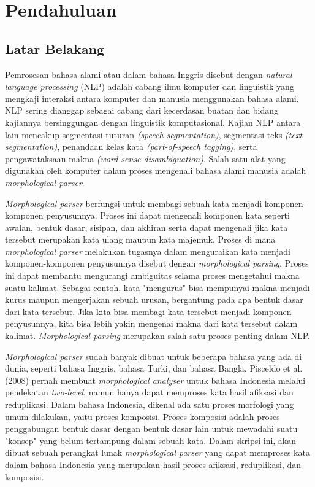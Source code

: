 \chapter{Pendahuluan}
\label{chap:pendahuluan}

\section{Latar Belakang}
\label{sec:latarBelakang}

Pemrosesan bahasa alami atau dalam bahasa Inggris disebut dengan {\it natural language processing} (NLP) adalah cabang ilmu komputer dan linguistik yang mengkaji interaksi antara komputer dan manusia menggunakan bahasa alami. NLP sering dianggap sebagai cabang dari kecerdasan buatan dan bidang kajiannya bersinggungan dengan linguistik komputasional. Kajian NLP antara lain mencakup segmentasi tuturan {\it (speech segmentation)}, segmentasi teks {\it (text segmentation)}, penandaan kelas kata {\it (part-of-speech tagging)}, serta pengawataksaan makna {\it (word sense disambiguation)}. Salah satu alat yang digunakan oleh komputer dalam proses mengenali bahasa alami manusia adalah {\it morphological parser}.

{\it Morphological parser} berfungsi untuk membagi sebuah kata menjadi komponen-komponen penyusunnya. Proses ini dapat mengenali komponen kata seperti awalan, bentuk dasar, sisipan, dan akhiran serta dapat mengenali jika kata tersebut merupakan kata ulang maupun kata majemuk. Proses di mana {\it morphological parser} melakukan tugasnya dalam menguraikan kata menjadi komponen-komponen penyusunnya disebut dengan {\it morphological parsing}. Proses ini dapat membantu mengurangi ambiguitas selama proses mengetahui makna suatu kalimat. Sebagai contoh, kata "mengurus" bisa mempunyai makna menjadi kurus maupun mengerjakan sebuah urusan, bergantung pada apa bentuk dasar dari kata tersebut. Jika kita bisa membagi kata tersebut menjadi komponen penyusunnya, kita bisa lebih yakin mengenai makna dari kata tersebut dalam kalimat. {\it Morphological parsing} merupakan salah satu proses penting dalam NLP.

{\it Morphological parser} sudah banyak dibuat untuk beberapa bahasa yang ada di dunia, seperti bahasa Inggris, bahasa Turki\cite{hasim:08:turkish}, dan bahasa Bangla\cite{sajib:10:bangla}. Pisceldo et al. (2008) pernah membuat \textit{morphological analyser} untuk bahasa Indonesia melalui pendekatan \textit{two-level}, namun hanya dapat memproses kata hasil afiksasi dan reduplikasi. Dalam bahasa Indonesia, dikenal ada satu proses morfologi yang umum dilakukan, yaitu proses komposisi. Proses komposisi adalah proses penggabungan bentuk dasar dengan bentuk dasar lain untuk mewadahi suatu "konsep" yang belum tertampung dalam sebuah kata\cite{chaer:08:morfologi}. Dalam skripsi ini, akan dibuat sebuah perangkat lunak {\it morphological parser} yang dapat memproses kata dalam bahasa Indonesia yang merupakan hasil proses afiksasi, reduplikasi, dan komposisi.

